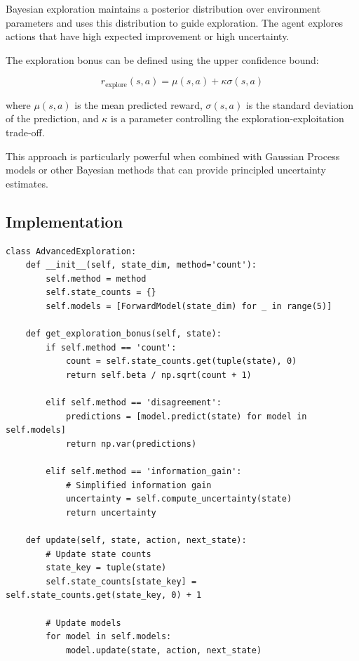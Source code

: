 \documentclass[12pt]{article}
\begin{document}
{{{Bayesian exploration maintains a posterior distribution over environment parameters and uses this distribution to guide exploration. The agent explores actions that have high expected improvement or high uncertainty.

The exploration bonus can be defined using the upper confidence bound:

\begin{equation}
r_{\text{explore}}(s, a) = \mu(s, a) + \kappa \sigma(s, a)
\end{equation}

where $\mu(s, a)$ is the mean predicted reward, $\sigma(s, a)$ is the standard deviation of the prediction, and $\kappa$ is a parameter controlling the exploration-exploitation trade-off.

This approach is particularly powerful when combined with Gaussian Process models or other Bayesian methods that can provide principled uncertainty estimates.

\subsection{Implementation}

\begin{verbatim}
class AdvancedExploration:
    def __init__(self, state_dim, method='count'):
        self.method = method
        self.state_counts = {}
        self.models = [ForwardModel(state_dim) for _ in range(5)]
        
    def get_exploration_bonus(self, state):
        if self.method == 'count':
            count = self.state_counts.get(tuple(state), 0)
            return self.beta / np.sqrt(count + 1)
            
        elif self.method == 'disagreement':
            predictions = [model.predict(state) for model in self.models]
            return np.var(predictions)
            
        elif self.method == 'information_gain':
            # Simplified information gain
            uncertainty = self.compute_uncertainty(state)
            return uncertainty
            
    def update(self, state, action, next_state):
        # Update state counts
        state_key = tuple(state)
        self.state_counts[state_key] = self.state_counts.get(state_key, 0) + 1
        
        # Update models
        for model in self.models:
            model.update(state, action, next_state)
\end{verbatim}

}}}
\end{document}
